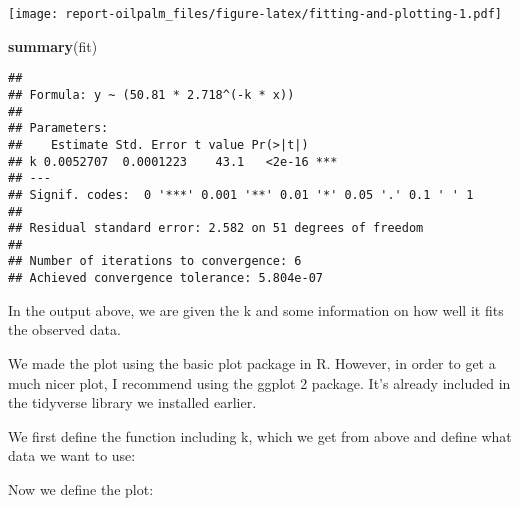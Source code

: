 \documentclass[
]{article}
\newenvironment{Shaded}{\begin{snugshade}}{\end{snugshade}}
\newcommand{\ControlFlowTok}[1]{\textcolor[rgb]{0.13,0.29,0.53}{\textbf{#1}}}
\newcommand{\DataTypeTok}[1]{\textcolor[rgb]{0.13,0.29,0.53}{#1}}
\newcommand{\FloatTok}[1]{\textcolor[rgb]{0.00,0.00,0.81}{#1}}
\newcommand{\KeywordTok}[1]{\textcolor[rgb]{0.13,0.29,0.53}{\textbf{#1}}}
\newcommand{\NormalTok}[1]{#1}
\newcommand{\OperatorTok}[1]{\textcolor[rgb]{0.81,0.36,0.00}{\textbf{#1}}}
\newcommand{\StringTok}[1]{\textcolor[rgb]{0.31,0.60,0.02}{#1}}
\begin{document}
\texttt{[image: report-oilpalm\_files/figure-latex/fitting-and-plotting-1.pdf]}

\begin{Shaded}
\begin{Highlighting}[]
\KeywordTok{summary}\NormalTok{(fit)}
\end{Highlighting}
\end{Shaded}

\begin{verbatim}
## 
## Formula: y ~ (50.81 * 2.718^(-k * x))
## 
## Parameters:
##    Estimate Std. Error t value Pr(>|t|)    
## k 0.0052707  0.0001223    43.1   <2e-16 ***
## ---
## Signif. codes:  0 '***' 0.001 '**' 0.01 '*' 0.05 '.' 0.1 ' ' 1
## 
## Residual standard error: 2.582 on 51 degrees of freedom
## 
## Number of iterations to convergence: 6 
## Achieved convergence tolerance: 5.804e-07
\end{verbatim}

In the output above, we are given the k and some information on how well
it fits the observed data.

We made the plot using the basic plot package in R. However, in order to
get a much nicer plot, I recommend using the ggplot 2 package. It's
already included in the tidyverse library we installed earlier.

We first define the function including k, which we get from above and
define what data we want to use:

\begin{Shaded}
\end{Shaded}

Now we define the plot:
\end{document}

